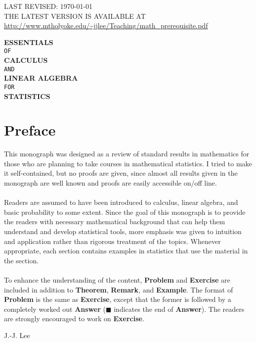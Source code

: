 \documentclass[12pt,letterpaper]{book}
\numberwithin{equation}{section}
\theoremstyle{definition}
\begin{document}
\noindent
LAST REVISED: \today \quad \currenttime\\
THE LATEST VERSION IS AVAILABLE AT \url{http://www.mtholyoke.edu/~jjlee/Teaching/math_prerequisite.pdf}
\vspace{3cm}
\begin{center}
{\Huge\textbf{ESSENTIALS}} \bigskip \\ {\large \texttt{OF}} \bigskip \\
{\Huge\textbf{CALCULUS}} \bigskip \\ {\large \texttt{AND}} \bigskip \\
{\Huge\textbf{LINEAR ALGEBRA}} \bigskip \\ {\large \texttt{FOR}} \bigskip \\
{\Huge\textbf{STATISTICS}}
\end{center}

\tableofcontents

\chapter*{Preface}
This monograph was designed as a review of standard results in mathematics for those who are planning to take courses in mathematical statistics. I tried to make it self-contained, but no proofs are given, since almost all results given in the monograph are well known and  proofs are easily accessible on/off line.\\\\
Readers are assumed to have been introduced to calculus, linear algebra, and basic probability to some extent. Since the goal of this monograph is to provide the readers with necessary mathematical background that can help them understand and develop statistical tools, more emphasis was given to intuition and application rather than rigorous treatment of the topics. Whenever appropriate, each section contains examples in statistics that use the material in the section. \\\\
To enhance the understanding of the content, \textbf{Problem} and \textbf{Exercise} are included in addition to \textbf{Theorem}, \textbf{Remark}, and \textbf{Example}. The format of \textbf{Problem} is the same as \textbf{Exercise}, except that the former is followed by a completely worked out \textbf{Answer} ($\blacksquare$ indicates the end of \textbf{Answer}). The readers are strongly encouraged to work on \textbf{Exercise}.

\bigskip
\begin{flushright}
J.-J. Lee
\end{flushright}
\end{document}
